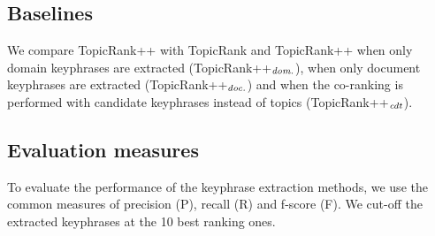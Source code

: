   \subsection{Baselines}
  \label{subsec:baselines}
    We compare TopicRank++ with TopicRank and TopicRank++ when only domain
    keyphrases are extracted (TopicRank++$_\textnormal{\textit{dom.}}$), when
    only document keyphrases are extracted
    (TopicRank++$_\textnormal{\textit{doc.}}$) and when the co-ranking is
    performed with candidate keyphrases instead of topics
    (TopicRank++$_\textnormal{\textit{cdt}}$).

  \subsection{Evaluation measures}
  \label{subsec:evaluation_measures}
    To evaluate the performance of the keyphrase extraction methods, we use the
    common measures of precision (P), recall (R) and f-score (F). We cut-off the
    extracted keyphrases at the 10 best ranking ones.

